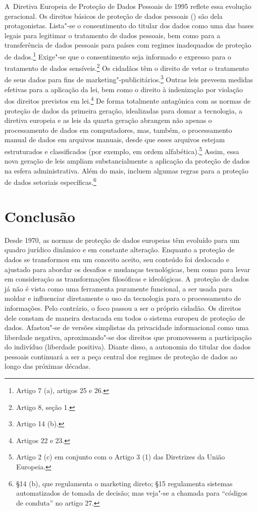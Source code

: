 A~Diretiva Europeia de Proteção de Dados Pessoais de 1995 reflete essa
evolução geracional. Os direitos básicos de proteção de dados pessoais
() são dela protagonistas. Lista"-se o consentimento do titular dos
dados como uma das bases legais para legitimar o tratamento de dados
pessoais, bem como para a transferência de dados pessoais para países
com regimes inadequados de proteção de dados.\footnote{Artigo 7 (a),
  artigos 25 e 26.} Exige"-se que o consentimento seja informado e
expresso para o tratamento de dados sensíveis.\footnote{Artigo 8, seção
  1.} Os cidadãos têm o direito de vetar o tratamento de seus dados para
fins de marketing"-publicitários.\footnote{Artigo 14 (b).} Outras leis
preveem medidas efetivas para a aplicação da lei, bem como o direito à
indenização por violação dos direitos previstos em lei.\footnote{Artigos
  22 e 23.} De forma totalmente antagônica com as normas de proteção de
dados da primeira geração, idealizadas para domar a tecnologia, a
diretiva europeia e as leis da quarta geração abrangem não apenas o
processamento de dados em computadores, mas, também, o processamento
manual de dados em arquivos manuais, desde que esses arquivos estejam
estruturados e classificados (por exemplo, em ordem
alfabética).\footnote{Artigo 2 (c) em conjunto com o Artigo 3 (1) das
  Diretrizes da União Europeia.} Assim, essa nova geração de leis
ampliam substancialmente a aplicação da proteção de dados na esfera
administrativa. Além do mais, incluem algumas regras para a proteção de
dados setoriais específicas.\footnote{§14 (b), que regulamenta o
  marketing direto; §15 regulamenta sistemas automatizados de tomada de
  decisão; mas veja"-se a chamada para ``códigos de conduta'' no artigo
  27.}

\section{Conclusão}

Desde 1970, as normas de proteção de dados europeias têm evoluído para
um quadro jurídico dinâmico e em constante alteração. Enquanto a
proteção de dados se transformou em um conceito aceito, seu conteúdo foi
deslocado e ajustado para abordar os desafios e mudanças tecnológicas,
bem como para levar em consideração as transformações filosóficas e
ideológicas. A~proteção de dados já não é vista como uma ferramenta
puramente funcional, a ser usada para moldar e influenciar diretamente o
uso da tecnologia para o processamento de informações. Pelo contrário, o
foco passou a ser o próprio cidadão. Os direitos dele constam de maneira
destacada em todos o sistema europeu de proteção de dados. Afastou"-se de
versões simplistas da privacidade informacional como uma liberdade
negativa, aproximando"-se dos direitos que promovessem a participação do
indivíduo (liberdade positiva). Diante disso, a autonomia do titular dos
dados pessoais continuará a ser a peça central dos regimes de proteção
de dados ao longo das próximas décadas.

